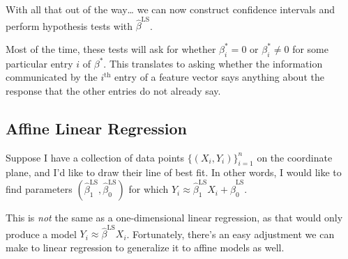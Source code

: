 With all that out of the way\dots
we can now construct confidence intervals
and perform hypothesis tests
with $\hat{\beta}^{\mathrm{LS}}$.

\begin{remark}
    Most of the time,
    these tests will ask for whether
    $\beta_i^* = 0$ or $\beta_i^* \neq 0$
    for some particular entry $i$
    of $\beta^*$.
    This translates to asking
    whether the information communicated
    by the $i^{\text{th}}$ entry of a feature vector
    says anything about the response
    that the other entries do not already say.
\end{remark}

\subsection{Affine Linear Regression}

Suppose I have a collection of data points
$\{(X_i, Y_i)\}_{i = 1}^n$
on the coordinate plane,
and I'd like to draw their line of best fit.
In other words, I would like to find
parameters $(\hat{\beta}_1^{\mathrm{LS}}, \hat{\beta}_0^{\mathrm{LS}})$
for which $Y_i \approx \hat{\beta}^{\mathrm{LS}}_1X_i
+ \hat{\beta}^{\mathrm{LS}}_0$.

This is \emph{not} the same as
a one-dimensional linear regression,
as that would only produce a model
$Y_i \approx \hat{\beta}^{\mathrm{LS}}X_i$.
Fortunately, there's an easy adjustment
we can make to linear regression
to generalize it to affine models as well.

